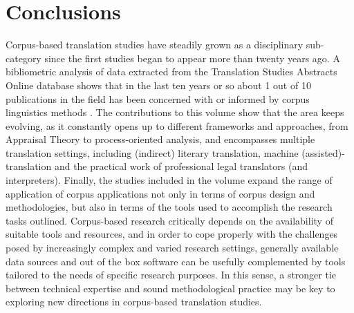 \documentclass[output=paper]{LSP/langsci}
\begin{document}
\section{Conclusions}
Corpus-based translation studies have steadily grown as a disciplinary sub-cat\-egory since the first studies began to appear more than twenty years ago. A bibliometric analysis of data extracted from the Translation Studies Abstracts Online database shows that in the last ten years or so about 1 out of 10 publications in the field has been concerned with or informed by corpus linguistics methods \citep{Zanettin2015}. The contributions to this volume show that the area keeps evolving, as it constantly opens up to different frameworks and approaches, from Appraisal Theory to process-oriented analysis, and encompasses multiple translation settings, including (indirect) literary translation, machine (assisted)-translation and the practical work of professional legal translators (and interpreters). Finally, the studies included in the volume expand the range of application of corpus applications not only in terms of corpus design and methodologies, but also in terms of the tools used to accomplish the research tasks outlined. Corpus-based research critically depends on the availability of suitable tools and resources, and in order to cope properly with the challenges posed by increasingly complex and varied research settings, generally available data sources and out of the box software can be usefully complemented by tools tailored to the needs of specific research purposes. In this sense, a stronger tie between technical expertise and sound methodological practice may be key to exploring new directions in corpus-based translation studies.

\printbibliography[heading=subbibliography,notkeyword=this]
\end{document}

